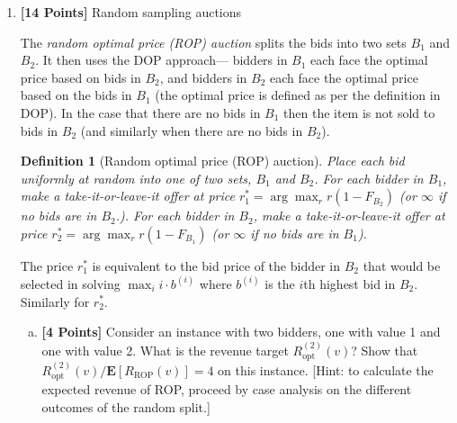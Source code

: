 \documentclass[11pt]{article}
\newcommand{\points}[1]{\textbf{[#1 Points]}}
\newtheorem{definition}{Definition}
\begin{document}
\begin{enumerate}[1.]
\begin{enumerate}[(a)]
  \textbf{Solution: beef up the critical value argument????}

  Intuitively, we get the sense that the profit extractor is a somewhat greedy algorithm so we immediately feel that it should be monotone. We can formalize this by seeing that the profit extractor ranks bids in decreasing order and selects the largest k willing to pay $\frac{R}{k}$.  By this definition, we see that an agent bidding higher value can only possibly result in a higher probability of being selected.

  We see also that the profit extractor's payment rule follows the definition of critical value.  Since the profit extractor charges the amount which is responsible for deciding who is allocated, we see that this amount is also the critical value an agent must bid to still be selected.

  Given that we have monotonicity and critical value payment, we see that the profit extractor will enforce truthful bidding and strategy-proofness.


\end{enumerate}


\item \points{14}  Random sampling auctions

  The {\em random optimal price (ROP) auction} splits the bids into
  two sets $B_1$ and $B_2$. It then uses the DOP approach--- bidders
  in $B_1$ each face the optimal price based on bids in $B_2$, and
  bidders in $B_2$ each face the optimal price based on the bids in
  $B_1$ (the optimal price is defined as per the definition in DOP).
  In the case that there are no bids in $B_1$ then the item is not
  sold to bids in $B_2$ (and similarly when there are no bids in
  $B_2$).  

\begin{definition}[Random optimal price (ROP) auction]
Place each bid uniformly at random into one of two sets, $B_1$
and $B_2$. For each bidder in $B_1$, make a take-it-or-leave-it
offer at price $r^\ast_1=\arg\max_r r(1-F_{B_2})$ (or $\infty$
if no bids are in $B_2$.). For each bidder
in $B_2$, make a take-it-or-leave-it offer at price $r^\ast_2=\arg\max_r r(1-F_{B_1})$ (or $\infty$ if no bids are in $B_1$).
\end{definition}


The price $r^\ast_1$ is equivalent to the bid price of the bidder
in $B_2$ that would be selected in solving $\max_i i\cdot b^{(i)}$
where $b^{(i)}$ is the $i$th highest bid in $B_2$. Similarly
for $r^\ast_2$.
\fi
%
%
\begin{enumerate}[(a)]
\item \points{4} Consider an instance with two bidders, one with value
  1 and one with value 2. What is the revenue target
  $R_{\mathrm{opt}}^{(2)}(v)$? Show that $R_{\mathrm{opt}}^{(2)}(v)/
\mathbf{E}[R_{\mathrm{ROP}}(v)]=4$ on this instance.
[Hint: to calculate the expected revenue of ROP, proceed
by case analysis on the different outcomes of the
  random split.]


\end{enumerate}
\end{enumerate}
\end{document}
